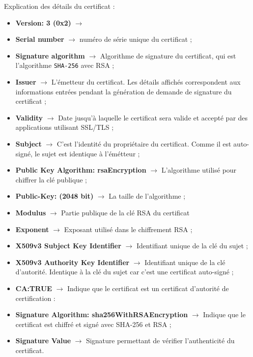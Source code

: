 \documentclass[12pt,a4paper]{article}
\begin{document}
Explication des détails du certificat : \\

\begin{itemize}
	\item \textbf{Version: 3 (0x2)} $\rightarrow$ 
	\item \textbf{Serial number} $\rightarrow$ numéro de série unique du certificat ;
	\item \textbf{Signature algorithm} $\rightarrow$ Algorithme de signature du certificat, qui est l'algorithme \texttt{SHA-256} avec RSA ;  
	\item \textbf{Issuer} $\rightarrow$ L'émetteur du certificat. Les détails affichés correspondent aux informations entrées pendant la génération de demande de signature du certificat ;
	\item \textbf{Validity} $\rightarrow$ Date jusqu'à laquelle le certificat sera valide et accepté par des applications utilisant SSL/TLS ;
	\item \textbf{Subject} $\rightarrow$ C'est l'identité du propriétaire du certificat. Comme il est auto-signé, le sujet est identique à l'émétteur ;
	\item \textbf{Public Key Algorithm: rsaEncryption} $\rightarrow$ L'algorithme utilisé pour chiffrer la clé publique ;
	\item \textbf{Public-Key: (2048 bit)} $\rightarrow$ La taille de l'algorithme ;
	\item \textbf{Modulus} $\rightarrow$ Partie publique de la clé RSA du certificat
	\item \textbf{Exponent} $\rightarrow$ Exposant utilisé dans le chiffrement RSA ;
	\item \textbf{X509v3 Subject Key Identifier} $\rightarrow$  Identifiant unique de la clé du sujet ;
	\item \textbf{X509v3 Authority Key Identifier} $\rightarrow$ Identifiant unique de la clé d'autorité. Identique à la clé du sujet car c'est une certificat auto-signé ;
	\item \textbf{CA:TRUE} $\rightarrow$ Indique que le certificat est un certificat d'autorité de certification :
	\item \textbf{Signature Algorithm: sha256WithRSAEncryption} $\rightarrow$ Indique que le certificat est chiffré et signé avec SHA-256 et RSA ;
	\item \textbf{Signature Value} $\rightarrow$	Signature permettant de vérifier l'authenticité du certificat.
	\end{itemize}
\end{document}

